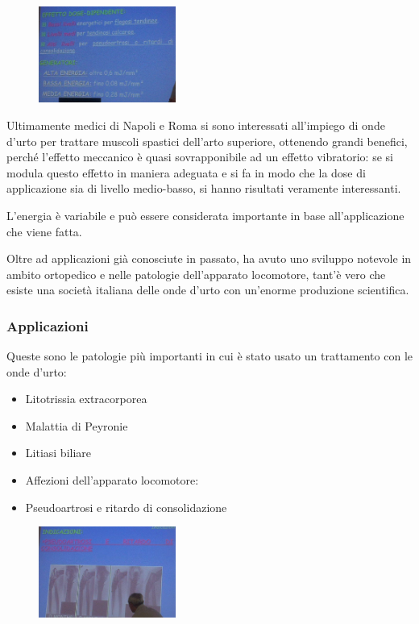 \begin{figure}[!ht]
\centering
\includegraphics[width=0.4\textwidth]{025/image18.jpeg}
\end{figure}

Ultimamente medici di Napoli e Roma si sono interessati all'impiego di
onde d'urto per trattare muscoli spastici dell'arto superiore, ottenendo
grandi benefici, perché l'effetto meccanico è quasi sovrapponibile ad un
effetto vibratorio: se si modula questo effetto in maniera adeguata e si
fa in modo che la dose di applicazione sia di livello medio-basso, si
hanno risultati veramente interessanti.

L'energia è variabile e può essere considerata importante in base
all'applicazione che viene fatta.

Oltre ad applicazioni già conosciute in passato, ha avuto uno sviluppo
notevole in ambito ortopedico e nelle patologie dell'apparato
locomotore, tant'è vero che esiste una società italiana delle onde
d'urto con un'enorme produzione scientifica.

\subsubsection{Applicazioni}

Queste sono le patologie più importanti in cui è stato usato un
trattamento con le onde d'urto:

\begin{itemize}
\item
  Litotrissia extracorporea
\item
  Malattia di Peyronie
\item
  Litiasi biliare
\item
  Affezioni dell'apparato locomotore:
\item
  Pseudoartrosi e ritardo di consolidazione
\end{itemize}

\begin{figure}[!ht]
\centering
\includegraphics[width=0.4\textwidth]{025/image19.jpeg}
\end{figure}

